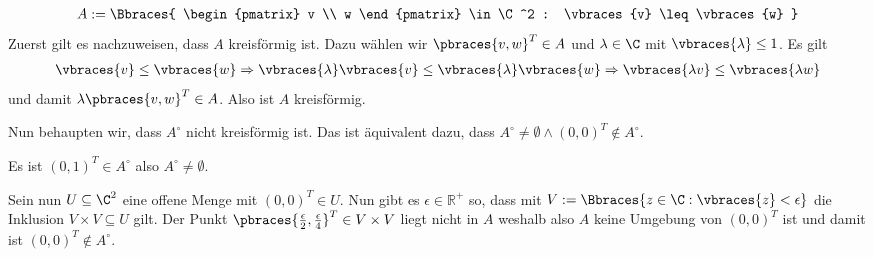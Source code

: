 \begin{solution}
\begin{enumerate}[label = (\roman*)]
  \begin{align*}
    A := \Bbraces{
      \begin{pmatrix}
        v \\ w
      \end{pmatrix}
      \in \C^2 : \vbraces{v} \leq \vbraces{w} }
  \end{align*}
  Zuerst gilt es nachzuweisen, dass $A$ kreisförmig ist. Dazu wählen wir $\pbraces{v,w}^T \in A$ und $\lambda \in \C$ mit $\vbraces{\lambda} \leq 1$. Es gilt
  \begin{align*}
    \vbraces{v} \leq \vbraces{w} \Rightarrow \vbraces{\lambda} \vbraces{v} \leq \vbraces{\lambda} \vbraces{w} \Rightarrow \vbraces{\lambda v} \leq \vbraces{\lambda w}
  \end{align*}
  und damit $\lambda \pbraces{v, w}^T \in A$. Also ist $A$ kreisförmig.

  Nun behaupten wir, dass $A^\circ$ nicht kreisförmig ist. Das ist äquivalent dazu, dass $A^\circ \neq \emptyset \land (0,0)^T \notin A^\circ$.

  Es ist $(0,1)^T \in A^\circ$ also $A^\circ \neq \emptyset$.

  Sein nun $U \subseteq \C^2$ eine offene Menge mit $(0,0)^T \in U$. Nun gibt es $\epsilon \in \mathbb{R}^+$ so, dass mit $V:= \Bbraces{z \in \C : \vbraces{z} < \epsilon}$ die Inklusion $V \times V \subseteq U$ gilt. Der Punkt $\pbraces{\frac{\epsilon}{2}, \frac{\epsilon}{4} }^T \in V \times V$ liegt nicht in $A$ weshalb also $A$ keine Umgebung von $(0,0)^T$ ist und damit ist $(0,0)^T \notin A^\circ$.

\end{enumerate}

\end{solution}

